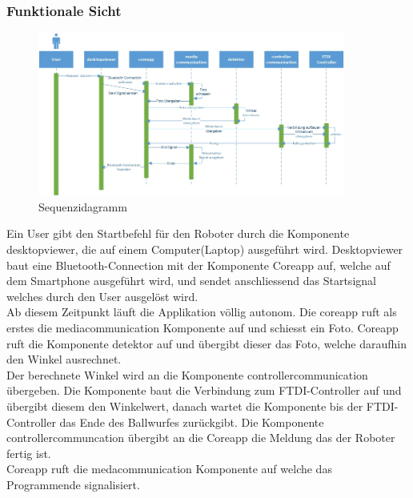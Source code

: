 	\subsubsection{Funktionale Sicht}
	
	\begin{figure}[h!]
		\centering
		\includegraphics[width=0.9\textwidth]{Enddokumentation/Loesungskonzept/Bilder/Sequenzdiagramm.jpg}
		\caption{Sequenzidagramm}		
	\end{figure}
Ein User gibt den Startbefehl für den Roboter durch die Komponente desktopviewer, die auf einem Computer(Laptop) ausgeführt wird. Desktopviewer baut eine Bluetooth-Connection mit der Komponente Coreapp auf, welche auf dem Smartphone ausgeführt wird, und sendet anschliessend das Startsignal welches durch den User ausgelöst wird. \\
Ab diesem Zeitpunkt läuft die Applikation völlig autonom. Die coreapp ruft als erstes die mediacommunication Komponente auf und schiesst ein Foto. Coreapp ruft die Komponente 	detektor auf und übergibt dieser das Foto, welche daraufhin den Winkel ausrechnet.\\
Der berechnete Winkel wird an die Komponente controllercommunication übergeben. Die Komponente baut die Verbindung zum FTDI-Controller auf und übergibt diesem den Winkelwert, danach wartet die Komponente bis der FTDI-Controller das Ende des Ballwurfes zurückgibt. Die Komponente controllercommuncation übergibt an die Coreapp die Meldung das der Roboter fertig ist. \\
Coreapp ruft die medacommunication Komponente auf welche das Programmende signalisiert.
		
		
